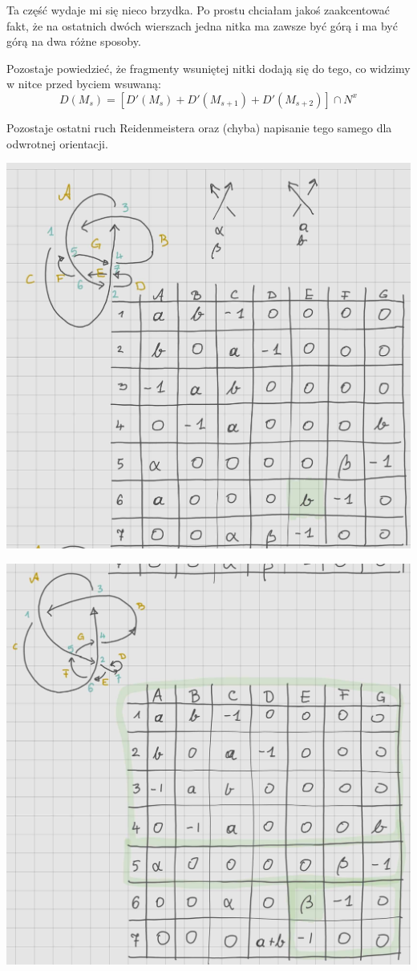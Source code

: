 Ta część wydaje mi się nieco brzydka. Po prostu chciałam jakoś zaakcentować fakt, że na ostatnich dwóch wierszach jedna nitka ma zawsze być górą i ma być górą na dwa różne sposoby.

Pozostaje powiedzieć, że fragmenty wsuniętej nitki dodają się do tego, co widzimy w nitce przed byciem wsuwaną:
$$D(M_s)=[D'(M_s)+D'(M_{s+1})+D'(M_{s+2})]\cap N^x$$

Pozostaje ostatni ruch Reidenmeistera oraz (chyba) napisanie tego samego dla odwrotnej orientacji.

\begin{center}
  \includegraphics[width=\textwidth]{./rozdzialy/relacja_trefl_3.jpg}

  \includegraphics[width=\textwidth] {./rozdzialy/relacja_trefl_4.jpg}
\end{center}

